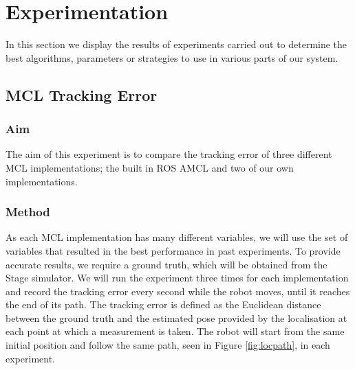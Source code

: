 \documentclass[conference]{IEEEtran}
\begin{document}
\section{Experimentation}
In this section we display the results of experiments carried out to determine the best algorithms, parameters or strategies to use in various parts of our system.
\subsection{MCL Tracking Error}

\subsubsection{Aim}
The aim of this experiment is to compare the tracking error of three different MCL implementations; the built in ROS AMCL and two of our own implementations.
\subsubsection{Method}
As each MCL implementation has many different variables, we will use the set of variables that resulted in the best performance in past experiments. To provide accurate results, we require a ground truth, which will be obtained from the Stage simulator. We will run the experiment three times for each implementation and record the tracking error every second while the robot moves, until it reaches the end of its path. The tracking error is defined as the Euclidean distance between the ground truth and the estimated pose provided by the localisation at each point at which a measurement is taken. The robot will start from the same initial position and follow the same path, seen in Figure \ref{fig:locpath}, in each experiment.
\end{document}
